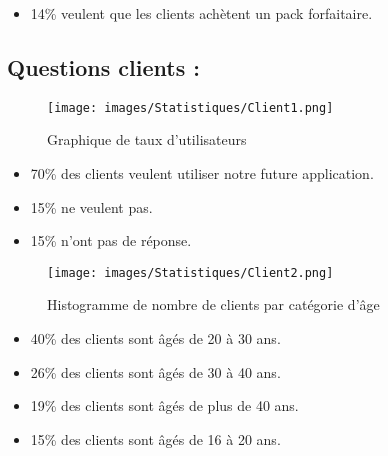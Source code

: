 {\begin{minipage}[c]{.4\linewidth}
\begin{itemize}
\item  14\% veulent que les clients achètent un pack forfaitaire.
\end{itemize}
\end{minipage}



\subsection*{Questions clients :}

\begin{minipage}[c]{.6\linewidth}
\begin{figure}[H]
\centering
\texttt{[image: images/Statistiques/Client1.png]}
\caption{Graphique de taux d'utilisateurs}
\end{figure}
 \end{minipage}\hfill
\begin{minipage}[c]{.4\linewidth}
\begin{itemize}
\item 70\% des clients veulent utiliser notre 
future application.

\item 15\% ne veulent pas.

\item 15\% n’ont pas de réponse.
\end{itemize}
\end{minipage}


\begin{minipage}[c]{.6\linewidth}
\begin{figure}[H]
\centering
\texttt{[image: images/Statistiques/Client2.png]}
\caption{Histogramme  de nombre de clients par catégorie d'âge}
\end{figure}
 \end{minipage}\hfill
\begin{minipage}[c]{.4\linewidth}
\begin{itemize}
\item 40\% des clients sont âgés de 20 à 30 ans.

\item  26\% des clients sont âgés de 30 à 40 ans.

\item  19\% des clients sont âgés de plus de 40 ans.

\item  15\% des clients sont âgés de 16 à 20 ans.
\end{itemize}
\end{minipage}

}
